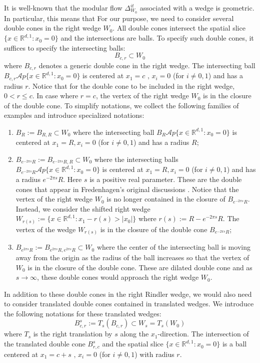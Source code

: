 \documentclass[a4paper,11pt]{article}
\theoremstyle{definition}
\theoremstyle{remark}
\begin{document}
It is well-known \cite{bisognanowichmann}that the modular flow $\Delta_{W_0}^{it}$ associated with a wedge is geometric. In particular, this means that For our purpose, we need to consider several double cones in the right wedge $W_0$. All double cones intersect the spatial slice $\{x\in\mathbb{R}^{d,1}: x_0 = 0\}$ and the intersections are balls. To specify such double cones, it suffices to specify the intersecting balls: 
\begin{equation}
    B_{c,r}\subset W_0
\end{equation}
where $B_{c,r}$ denotes a generic double cone in the right wedge. The intersecting ball $B_{c,r}\mathcal{A}p\{x\in\mathbb{R}^{d,1}:x_0 = 0\}$ is centered at $x_1 = c\text{ , }x_i = 0$ (for $i\neq 0,1$) and has a radius $r$. Notice that for the double cone to be included in the right wedge, $0 < r \leq c$. In case where $r = c$, the vertex of the right wedge $W_0$ is in the closure of the double cone. To simplify notations, we collect the following families of examples and introduce specialized notations:
\begin{enumerate}
    \item $B_R:=B_{R, R}\subset W_0$ where the intersecting ball $B_R\mathcal{A}p \{x\in\mathbb{R}^{d,1}: x_0 = 0\}$ is centered at $x_1 = R, x_i = 0$ (for $i\neq 0, 1$) and has a radius $R$;
    \item $B_{e^{-2\pi s}R} := B_{e^{-2\pi s}R, R}\subset W_0$ where the intersecting balls $B_{e^{-2\pi s}R}\mathcal{A}p\{x\in\mathbb{R}^{d,1}:x_0 =0\}$ is centered at $x_1 = R, x_i = 0$ (for $i\neq 0, 1$) and has a radius $e^{-2\pi s}R$. Here $s$ is a positive real parameter. These are the double cones that appear in Fredenhagen's original discussions \cite{fredenhagen}. Notice that the vertex of the right wedge $W_0$ is no longer contained in the closure of $B_{e^{-2\pi s}R}$. Instead, we consider the shifted right wedge $W_{r(s)}:= \{x\in\mathbb{R}^{d,1}: x_1 - r(s) > |x_0|\}$ where $r(s) := R - e^{-2\pi s}R$. The vertex of the wedge $W_{r(s)}$ is in the closure of the double cone $B_{e^{-2\pi s}R}$;
    \item $B_{e^{2\pi s}R}:= B_{e^{2\pi s}R, e^{2\pi s}R}\subset W_0$ where the center of the intersecting ball is moving away from the origin as the radius of the ball increases so that the vertex of $W_0$ is in the closure of the double cone. These are dilated double cone and as $s\rightarrow \infty$, these double cones would approach the right wedge $W_0$.
\end{enumerate}
In addition to these double cones in the right Rindler wedge, we would also need to consider translated double cones contained in translated wedges. We introduce the following notations for these translated wedges:
\begin{equation}
    B^s_{c,r} := T_s(B_{c,r})\subset W_s  = T_s(W_0)
\end{equation}
where $T_s$ is the right translation by $s$ along the $x_1$-direction. The intersection of the translated double cone $B^s_{r,c}$ and the spatial slice $\{x\in\mathbb{R}^{d,1}:x_0 = 0\}$ is a ball centered at $x_1 = c+ s\text{ , }x_i = 0$ (for $i\neq 0, 1$) with radius $r$.
\end{document}
